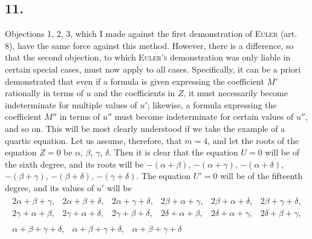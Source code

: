 \documentclass[12pt]{memoir}
\theoremstyle{plain}
\theoremstyle{remark}
\begin{document}
\subsection*{11.}

Objections 1, 2, 3, which I made against the first demonstration of \textsc{Euler} (art. 8), have the same force against this method. However, there is a difference, so that the second objection, to which \textsc{Euler's} demonstration was only liable in certain special cases, must now apply to all cases. Specifically, it can be a priori demonstrated that even if a formula is given expressing the coefficient \(M'\) rationally in terms of \(u\) and the coefficients in \(Z\), it must necessarily become indeterminate for multiple values of \(u'\); likewise, a formula expressing the coefficient \(M''\) in terms of \(u''\) must become indeterminate for certain values of \(u''\), and so on. This will be most clearly understood if we take the example of a quartic equation. Let us assume, therefore, that \(m = 4\), and let the roots of the equation \(Z = 0\) be \(\alpha\), \(\beta\), \(\gamma\), \(\delta\). Then it is clear that the equation \(U = 0\) will be of the sixth degree, and its roots will be \(-(\alpha+\beta)\), \(-(\alpha+\gamma)\), \(-(\alpha+\delta)\), \(-(\beta+\gamma)\), \(-(\beta+\delta)\), \(-(\gamma+\delta)\). The equation \(U'=0\) will be of the fifteenth degree, and its values of \(u'\) will be \[
\begin{array}{c}
\begin{array}{cccccc}
2\alpha+\beta+\gamma, & 2\alpha + \beta + \delta,& 2\alpha + \gamma + \delta, & 2\beta + \alpha + \gamma,& 2\beta + \alpha + \delta, & 2\beta + \gamma + \delta,\\
2\gamma+ \alpha + \beta, & 2\gamma + \alpha + \delta,& 2 \gamma + \beta + \delta,& 2 \delta + \alpha + \beta, &2\delta + \alpha + \gamma, &2\delta + \beta + \gamma,
\end{array} \\
\begin{array}{ccc}
\alpha + \beta + \gamma + \delta, & \alpha + \beta + \gamma + \delta, & \alpha + \beta + \gamma + \delta
\end{array}
\end{array}
\]
\end{document}
